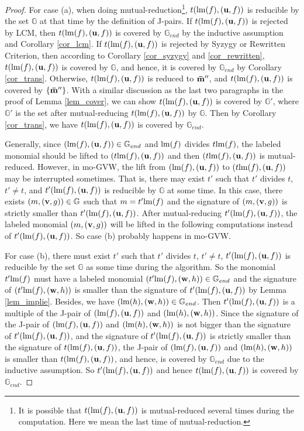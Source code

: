 \documentclass[final, number, 3p,12pt]{elsarticle}
\def\G{{\mathbb{G}}}
\def\brm{{\bf \bar{m}}}
\def\lm{{\rm lm}} %
\def\u{{\bf u}}
\def\v{{\bf v}}
\def\w{{\bf w}}
\begin{document}
\begin{proof}
For case (a), when doing mutual-reduction\footnote{It is possible that $t(\lm(f), (\u, f))$ is mutual-reduced several times during the computation. Here we mean the last time of mutual-reduction.}, $t(\lm(f), (\u, f))$ is reducible by the set $\G$ at that time by the definition of J-pairs. If $t(\lm(f), (\u, f))$ is rejected by LCM, then $t(\lm(f), (\u, f))$ is covered by $\G_{end}$ by the inductive assumption and Corollary \ref{cor_lcm}. If $t(\lm(f), (\u, f))$ is rejected by Syzygy or Rewritten Criterion, then according to Corollary \ref{cor_syzygy} and \ref{cor_rewritten}, $t(\lm(f), (\u, f))$ is covered by $\G$,  and hence, it is covered by $\G_{end}$ by Corollary \ref{cor_trans}. Otherwise, $t(\lm(f), (\u, f))$ is reduced to $\brm''$, and $t(\lm(f), (\u, f))$ is covered by $\{\brm''\}$. With a similar discussion as the last two paragraphs in the proof of Lemma \ref{lem_cover}, we can show $t(\lm(f), (\u, f))$ is covered by $\G'$, where $\G'$ is the set after mutual-reducing $t(\lm(f), (\u, f))$ by $\G$. Then by Corollary \ref{cor_trans}, we have $t(\lm(f), (\u, f))$ is covered by $\G_{end}$.


Generally, since $(\lm(f), (\u, f)) \in \G_{end}$ and $\lm(f)$ divides $t\lm(f)$, the labeled monomial should be lifted to $(t\lm(f), (\u, f))$ and then $(t\lm(f), (\u, f))$ is mutual-reduced. However, in mo-GVW, the lift from $(\lm(f), (\u, f))$ to $(t\lm(f), (\u, f))$ may be interrupted sometimes. That is, there may exist $t'$ such that $t'$ divides $t$, $t' \not= t$, and $t'(\lm(f), (\u, f))$ is reducible by $\G$ at some time. In this case, there exists $(m, (\v, g)) \in \G$ such that $m = t'\lm(f)$ and the signature of $(m, (\v, g))$ is strictly smaller than $t'(\lm(f), (\u, f))$. After mutual-reducing $t'(\lm(f), (\u, f))$, the labeled monomial $(m, (\v, g))$ will be lifted in the following computations instead of $t'(\lm(f), (\u, f))$. So case (b) probably happens in mo-GVW.

For case (b), there must exist $t'$ such that $t'$ divides $t$, $t' \not= t$, $t'(\lm(f), (\u, f))$ is reducible by the set $\G$ as some time during the algorithm. So the monomial $t'\lm(f)$ must have a labeled monomial $(t'\lm(f), (\w, h)) \in \G_{end}$ and the signature of $(t'\lm(f), (\w, h))$ is smaller than the signature of $t'(\lm(f), (\u, f))$ by Lemma \ref{lem_implie}. Besides, we have $(\lm(h), (\w, h))\in \G_{end}$. Then $t'(\lm(f), (\u, f))$ is a multiple of the J-pair of $(\lm(f), (\u, f))$ and $(\lm(h), (\w, h))$. Since the signature of the J-pair of $(\lm(f), (\u, f))$ and $(\lm(h), (\w, h))$ is not bigger than the signature of $t'(\lm(f), (\u, f))$, and the signature of $t'(\lm(f), (\u, f))$ is strictly smaller than the signature of $t(\lm(f), (\u, f))$, the J-pair of $(\lm(f), (\u, f))$ and $(\lm(h), (\w, h))$ is smaller than $t(\lm(f), (\u, f))$, and hence, is covered by $\G_{end}$ due to the inductive assumption. So $t'(\lm(f), (\u, f))$ and hence $t(\lm(f), (\u, f))$ is covered by $\G_{end}$.
\end{proof}
\end{document}
